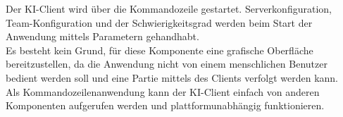 Der KI-Client wird über die Kommandozeile gestartet. Serverkonfiguration, Team-Konfiguration und der Schwierigkeitsgrad werden beim Start der Anwendung mittels Parametern gehandhabt. \\
Es besteht kein Grund, für diese Komponente eine grafische Oberfläche bereitzustellen, da die Anwendung nicht von einem menschlichen Benutzer bedient werden soll und eine Partie mittels des Clients verfolgt werden kann. \\
Als Kommandozeilenanwendung kann der KI-Client einfach von anderen Komponenten aufgerufen werden und plattformunabhängig funktionieren.